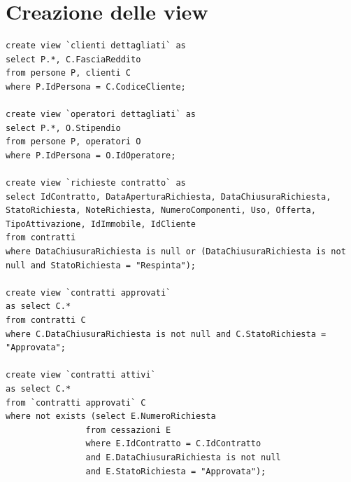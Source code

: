\documentclass[a4paper,12pt]{report}
\begin{document}
\section{Creazione delle view}
\begin{lstlisting}
create view `clienti dettagliati` as
select P.*, C.FasciaReddito
from persone P, clienti C
where P.IdPersona = C.CodiceCliente;
 
create view `operatori dettagliati` as
select P.*, O.Stipendio
from persone P, operatori O
where P.IdPersona = O.IdOperatore;
   
create view `richieste contratto` as
select IdContratto, DataAperturaRichiesta, DataChiusuraRichiesta, StatoRichiesta, NoteRichiesta, NumeroComponenti, Uso, Offerta, TipoAttivazione, IdImmobile, IdCliente
from contratti
where DataChiusuraRichiesta is null or (DataChiusuraRichiesta is not null and StatoRichiesta = "Respinta");
   
create view `contratti approvati`
as select C.*
from contratti C
where C.DataChiusuraRichiesta is not null and C.StatoRichiesta = "Approvata";
                                      
create view `contratti attivi`
as select C.*
from `contratti approvati` C
where not exists (select E.NumeroRichiesta
                from cessazioni E
                where E.IdContratto = C.IdContratto
                and E.DataChiusuraRichiesta is not null
                and E.StatoRichiesta = "Approvata");
\end{lstlisting}
\end{document}
